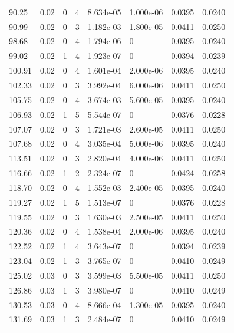 \documentclass[preview]{standalone}
\begin{document}
{{{\begin{tabular}{L{1.2cm}C{1.2cm} C{0.3cm}C{0.5cm} C{1.4cm}C{1.4cm} C{1.4cm}C{1.4cm}}
  90.25  &  0.02  & 0     &  4 &  8.634e-05  & 1.000e-06  & 0.0395 &  0.0240   \\ 
  90.99  &  0.02  & 0     &  3 &  1.182e-03  & 1.800e-05  & 0.0411 &  0.0250   \\ 
  98.68  &  0.02  & 0     &  4 &  1.794e-06  & 0  & 0.0395 &  0.0240   \\ 
  99.02  &  0.02  & 1     &  4 &  1.923e-07  & 0  & 0.0394 &  0.0239   \\ 
  100.91  &  0.02  & 0     &  4 &  1.601e-04  & 2.000e-06  & 0.0395 &  0.0240   \\ 
  102.33  &  0.02  & 0     &  3 &  3.992e-04  & 6.000e-06  & 0.0411 &  0.0250   \\ 
  105.75  &  0.02  & 0     &  4 &  3.674e-03  & 5.600e-05  & 0.0395 &  0.0240   \\ 
  106.93  &  0.02  & 1     &  5 &  5.544e-07  & 0  & 0.0376 &  0.0228   \\ 
  107.07  &  0.02  & 0     &  3 &  1.721e-03  & 2.600e-05  & 0.0411 &  0.0250   \\ 
  107.68  &  0.02  & 0     &  4 &  3.035e-04  & 5.000e-06  & 0.0395 &  0.0240   \\ 
  113.51  &  0.02  & 0     &  3 &  2.820e-04  & 4.000e-06  & 0.0411 &  0.0250   \\ 
  116.66  &  0.02  & 1     &  2 &  2.324e-07  & 0  & 0.0424 &  0.0258   \\ 
  118.70  &  0.02  & 0     &  4 &  1.552e-03  & 2.400e-05  & 0.0395 &  0.0240   \\ 
  119.27  &  0.02  & 1     &  5 &  1.513e-07  & 0  & 0.0376 &  0.0228   \\ 
  119.55  &  0.02  & 0     &  3 &  1.630e-03  & 2.500e-05  & 0.0411 &  0.0250   \\ 
  120.36  &  0.02  & 0     &  4 &  1.538e-04  & 2.000e-06  & 0.0395 &  0.0240   \\ 
  122.52  &  0.02  & 1     &  4 &  3.643e-07  & 0  & 0.0394 &  0.0239   \\ 
  123.04  &  0.02  & 1     &  3 &  3.765e-07  & 0  & 0.0410 &  0.0249   \\ 
  125.02  &  0.03  & 0     &  3 &  3.599e-03  & 5.500e-05  & 0.0411 &  0.0250   \\ 
  126.86  &  0.03  & 1     &  3 &  3.980e-07  & 0  & 0.0410 &  0.0249   \\ 
  130.53  &  0.03  & 0     &  4 &  8.666e-04  & 1.300e-05  & 0.0395 &  0.0240   \\ 
  131.69  &  0.03  & 1     &  3 &  2.484e-07  & 0  & 0.0410 &  0.0249   \\ 

\end{tabular}}}}
\end{document}
